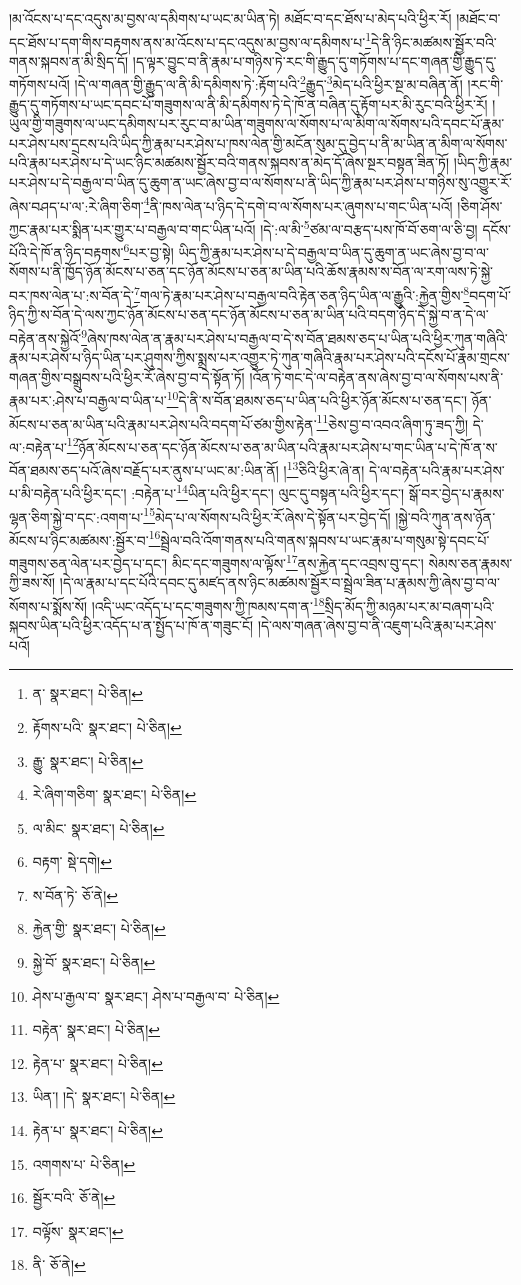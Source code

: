 །མ་འོངས་པ་དང་འདུས་མ་བྱས་ལ་དམིགས་པ་ཡང་མ་ཡིན་ཏེ། མཐོང་བ་དང་ཐོས་པ་མེད་པའི་ཕྱིར་རོ། །མཐོང་བ་དང་ཐོས་པ་དག་གིས་བརྟགས་ནས་མ་འོངས་པ་དང་འདུས་མ་བྱས་ལ་དམིགས་པ་\footnote{ན་  སྣར་ཐང་།  པེ་ཅིན། }དེ་ནི་ཉིང་མཚམས་སྦྱོར་བའི་གནས་སྐབས་ན་མི་སྲིད་དོ། །ད་ལྟར་བྱུང་བ་ནི་རྣམ་པ་གཉིས་ཏེ་རང་གི་རྒྱུད་དུ་གཏོགས་པ་དང་གཞན་གྱི་རྒྱུད་དུ་གཏོགས་པའོ། །དེ་ལ་གཞན་གྱི་རྒྱུད་ལ་ནི་མི་དམིགས་ཏེ་:རྟོག་པའི་\footnote{རྟོགས་པའི་  སྣར་ཐང་།  པེ་ཅིན། }རྒྱུད་\footnote{རྒྱུ་  སྣར་ཐང་།  པེ་ཅིན། }མེད་པའི་ཕྱིར་སྔ་མ་བཞིན་ནོ། །རང་གི་རྒྱུད་དུ་གཏོགས་པ་ཡང་དབང་པོ་གཟུགས་ལ་ནི་མི་དམིགས་ཏེ་དེ་ཁོ་ན་བཞིན་དུ་རྟོག་པར་མི་རུང་བའི་ཕྱིར་རོ། །ཡུལ་གྱི་གཟུགས་ལ་ཡང་དམིགས་པར་རུང་བ་མ་ཡིན་གཟུགས་ལ་སོགས་པ་ལ་མིག་ལ་སོགས་པའི་དབང་པོ་རྣམ་པར་ཤེས་པས་དྲངས་པའི་ཡིད་ཀྱི་རྣམ་པར་ཤེས་པ་ཁས་ལེན་གྱི་མངོན་སུམ་དུ་བྱེད་པ་ནི་མ་ཡིན་ན་མིག་ལ་སོགས་པའི་རྣམ་པར་ཤེས་པ་དེ་ཡང་ཉིང་མཚམས་སྦྱོར་བའི་གནས་སྐབས་ན་མེད་དོ་ཞེས་སྔར་བསྟན་ཟིན་ཏོ། །ཡིད་ཀྱི་རྣམ་པར་ཤེས་པ་དེ་བརྒྱལ་བ་ཡིན་དུ་ཆུག་ན་ཡང་ཞེས་བྱ་བ་ལ་སོགས་པ་ནི་ཡིད་ཀྱི་རྣམ་པར་ཤེས་པ་གཉིས་སུ་འགྱུར་རོ་ཞེས་བཤད་པ་ལ་:རེ་ཞིག་ཅིག་\footnote{རེ་ཞིག་གཅིག་  སྣར་ཐང་།  པེ་ཅིན། }ནི་ཁས་ལེན་པ་ཉིད་དེ་དགེ་བ་ལ་སོགས་པར་ཞུགས་པ་གང་ཡིན་པའོ། །ཅིག་ཤོས་ཀྱང་རྣམ་པར་སྨིན་པར་གྱུར་པ་བརྒྱལ་བ་གང་ཡིན་པའོ། །དེ་:ལ་མི་\footnote{ལ་མིང་  སྣར་ཐང་།  པེ་ཅིན། }ཙམ་ལ་བརྩད་པས་ཁོ་བོ་ཅག་ལ་ཅི་བྱ། དངོས་པོའི་དེ་ཁོ་ན་ཉིད་བརྟགས་\footnote{བརྟག་  སྡེ་དགེ། }པར་བྱ་སྟེ། ཡིད་ཀྱི་རྣམ་པར་ཤེས་པ་དེ་བརྒྱལ་བ་ཡིན་དུ་ཆུག་ན་ཡང་ཞེས་བྱ་བ་ལ་སོགས་པ་ནི་ཁྱོད་ཉོན་མོངས་པ་ཅན་དང་ཉོན་མོངས་པ་ཅན་མ་ཡིན་པའི་ཆོས་རྣམས་ས་བོན་ལ་རག་ལས་ཏེ་སྐྱེ་བར་ཁས་ལེན་པ་:ས་བོན་དེ་\footnote{ས་བོན་ཏེ་  ཅོ་ནེ། }གལ་ཏེ་རྣམ་པར་ཤེས་པ་བརྒྱལ་བའི་རྟེན་ཅན་ཉིད་ཡིན་ལ་རྒྱུའི་:རྐྱེན་གྱིས་\footnote{རྐྱེན་གྱི་  སྣར་ཐང་།  པེ་ཅིན། }བདག་པོ་ཉིད་ཀྱི་ས་བོན་དེ་ལས་ཀྱང་ཉོན་མོངས་པ་ཅན་དང་ཉོན་མོངས་པ་ཅན་མ་ཡིན་པའི་བདག་ཉིད་དེ་སྐྱེ་བ་ན་དེ་ལ་བརྟེན་ནས་སྐྱེའོ་\footnote{སྐྱེ་བོ་  སྣར་ཐང་།  པེ་ཅིན། }ཞེས་ཁས་ལེན་ན་རྣམ་པར་ཤེས་པ་བརྒྱལ་བ་དེ་ས་བོན་ཐམས་ཅད་པ་ཡིན་པའི་ཕྱིར་ཀུན་གཞིའི་རྣམ་པར་ཤེས་པ་ཉིད་ཡིན་པར་ཤུགས་ཀྱིས་སྨྲས་པར་འགྱུར་ཏེ་ཀུན་གཞིའི་རྣམ་པར་ཤེས་པའི་དངོས་པོ་རྣམ་གྲངས་གཞན་གྱིས་བསྒྲུབས་པའི་ཕྱིར་རོ་ཞེས་བྱ་བ་དེ་སྟོན་ཏོ། །འོན་ཏེ་གང་དེ་ལ་བརྟེན་ནས་ཞེས་བྱ་བ་ལ་སོགས་པས་ནི་རྣམ་པར་:ཤེས་པ་བརྒྱལ་བ་ཡིན་པ་\footnote{ཤེས་པ་རྒྱལ་བ་  སྣར་ཐང་། ཤེས་པ་བརྒྱལ་བ་  པེ་ཅིན། }དེ་ནི་ས་བོན་ཐམས་ཅད་པ་ཡིན་པའི་ཕྱིར་ཉོན་མོངས་པ་ཅན་དང་། ཉོན་མོངས་པ་ཅན་མ་ཡིན་པའི་རྣམ་པར་ཤེས་པའི་བདག་པོ་ཙམ་གྱིས་རྟེན་\footnote{བརྟེན་  སྣར་ཐང་།  པེ་ཅིན། }ཅེས་བྱ་བ་འབའ་ཞིག་ཏུ་ཟད་ཀྱི། དེ་ལ་:བརྟེན་པ་\footnote{རྟེན་པ་  སྣར་ཐང་།  པེ་ཅིན། }ཉོན་མོངས་པ་ཅན་དང་ཉོན་མོངས་པ་ཅན་མ་ཡིན་པའི་རྣམ་པར་ཤེས་པ་གང་ཡིན་པ་དེ་ཁོ་ན་ས་བོན་ཐམས་ཅད་པའོ་ཞེས་བརྗོད་པར་ནུས་པ་ཡང་མ་:ཡིན་ནོ། །\footnote{ཡིན་། །དེ་  སྣར་ཐང་།  པེ་ཅིན། }ཅིའི་ཕྱིར་ཞེ་ན། དེ་ལ་བརྟེན་པའི་རྣམ་པར་ཤེས་པ་མི་བརྟེན་པའི་ཕྱིར་དང་། :བརྟེན་པ་\footnote{རྟེན་པ་  སྣར་ཐང་།  པེ་ཅིན། }ཡིན་པའི་ཕྱིར་དང་། ལུང་དུ་བསྟན་པའི་ཕྱིར་དང་། སྒོ་བར་བྱེད་པ་རྣམས་ལྷན་ཅིག་སྐྱེ་བ་དང་:འགག་པ་\footnote{འགགས་པ་  པེ་ཅིན། }མེད་པ་ལ་སོགས་པའི་ཕྱིར་རོ་ཞེས་དེ་སྟོན་པར་བྱེད་དོ། །སྐྱེ་བའི་ཀུན་ནས་ཉོན་མོངས་པ་ཉིང་མཚམས་:སྦྱོར་བ་\footnote{སྦྱོར་བའི་  ཅོ་ནེ། }སྦྲེལ་བའི་འོག་གནས་པའི་གནས་སྐབས་པ་ཡང་རྣམ་པ་གསུམ་སྟེ་དབང་པོ་གཟུགས་ཅན་ལེན་པར་བྱེད་པ་དང་། མིང་དང་གཟུགས་ལ་ལྟོས་\footnote{བལྟོས་  སྣར་ཐང་། }ནས་རྐྱེན་དང་འབྲས་བུ་དང་། སེམས་ཅན་རྣམས་ཀྱི་ཟས་སོ། །དེ་ལ་རྣམ་པ་དང་པོའི་དབང་དུ་མཛད་ནས་ཉིང་མཚམས་སྦྱོར་བ་སྦྲེལ་ཟིན་པ་རྣམས་ཀྱི་ཞེས་བྱ་བ་ལ་སོགས་པ་སྨོས་སོ། །འདི་ཡང་འདོད་པ་དང་གཟུགས་ཀྱི་ཁམས་དག་ན་\footnote{ནི་  ཅོ་ནེ། }སྲིད་མོད་ཀྱི་མཉམ་པར་མ་བཞག་པའི་སྐབས་ཡིན་པའི་ཕྱིར་འདོད་པ་ན་སྤྱོད་པ་ཁོ་ན་གཟུང་ངོ། །དེ་ལས་གཞན་ཞེས་བྱ་བ་ནི་འཇུག་པའི་རྣམ་པར་ཤེས་པའོ། 
